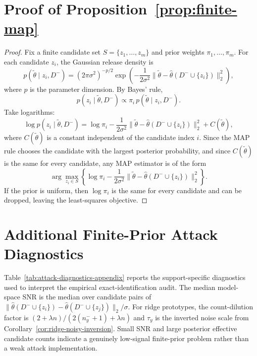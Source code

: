 \documentclass[conference,compsoc]{IEEEtran}
\begin{document}
\section{Proof of Proposition~\ref{prop:finite-map}}
\label{app:proof-finite-map}

\begin{proof}
Fix a finite candidate set $S=\{z_1,\dots,z_m\}$ and prior weights $\pi_1,\dots,\pi_m$. For each candidate $z_i$, the Gaussian release density is
\[
p(\widetilde\theta\mid z_i,D^-)
=
(2\pi\sigma^2)^{-p/2}
\exp\!\left(
-\frac{1}{2\sigma^2}\bigl\|\widetilde\theta-\widehat\theta(D^-\cup\{z_i\})\bigr\|_2^2
\right),
\]
where $p$ is the parameter dimension. By Bayes' rule,
\[
p(z_i\mid \widetilde\theta,D^-)
\propto
\pi_i\,p(\widetilde\theta\mid z_i,D^-).
\]
Take logarithms:
\[
\log p(z_i\mid \widetilde\theta,D^-)
=
\log \pi_i
-
\frac{1}{2\sigma^2}\bigl\|\widetilde\theta-\widehat\theta(D^-\cup\{z_i\})\bigr\|_2^2
+
C(\widetilde\theta),
\]
where $C(\widetilde\theta)$ is a constant independent of the candidate index $i$. Since the MAP rule chooses the candidate with the largest posterior probability, and since $C(\widetilde\theta)$ is the same for every candidate, any MAP estimator is of the form
\[
\arg\max_{z_i\in S}
\left\{
\log \pi_i
-
\frac{1}{2\sigma^2}\bigl\|\widetilde\theta-\widehat\theta(D^-\cup\{z_i\})\bigr\|_2^2
\right\}.
\]
If the prior is uniform, then $\log \pi_i$ is the same for every candidate and can be dropped, leaving the least-squares objective.
\end{proof}


\section{Additional Finite-Prior Attack Diagnostics}
\label{app:attack-diagnostics}

Table~\ref{tab:attack-diagnostics-appendix} reports the support-specific diagnostics used to interpret the empirical exact-identification audit. The median model-space SNR is the median over candidate pairs of $\|\hat\theta(D^-\cup\{z_i\})-\hat\theta(D^-\cup\{z_j\})\|_2/\sigma$. For ridge prototypes, the count-dilution factor is $(2+\lambda n)/(2(n_y^-+1)+\lambda n)$ and $\tau_y$ is the inverted noise scale from Corollary~\ref{cor:ridge-noisy-inversion}. Small SNR and large posterior effective candidate counts indicate a genuinely low-signal finite-prior problem rather than a weak attack implementation.
\end{document}
